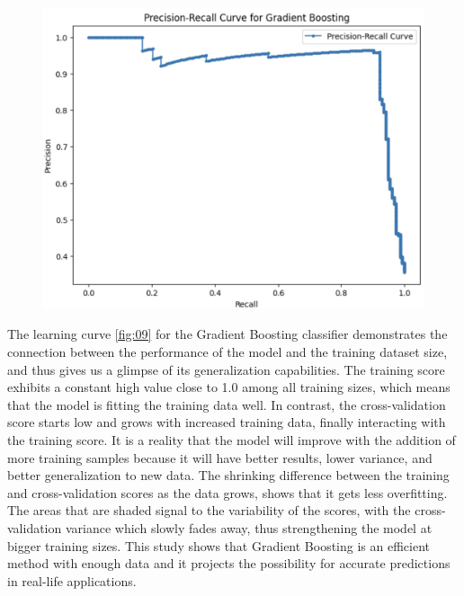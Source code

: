 \documentclass[conference]{IEEEtran} %
\begin{document}
\begin{figure}[ht]
    \centering
    \includegraphics[width=\linewidth]{Fig-08.pdf}
    \caption{}
    \label{fig:08}
\end{figure}
\FloatBarrier


The learning curve \ref{fig:09} for the Gradient Boosting classifier demonstrates the connection between the performance of the model and the training dataset size, and thus gives us a glimpse of its generalization capabilities. The training score exhibits a constant high value close to 1.0 among all training sizes, which means that the model is fitting the training data well. In contrast, the cross-validation score starts low and grows with increased training data, finally interacting with the training score. It is a reality that the model will improve with the addition of more training samples because it will have better results, lower variance, and better generalization to new data. The shrinking difference between the training and cross-validation scores as the data grows, shows that it gets less overfitting. The areas that are shaded signal to the variability of the scores, with the cross-validation variance which slowly fades away, thus strengthening the model at bigger training sizes. This study shows that Gradient Boosting is an efficient method with enough data and it projects the possibility for accurate predictions in real-life applications.
\end{document}
